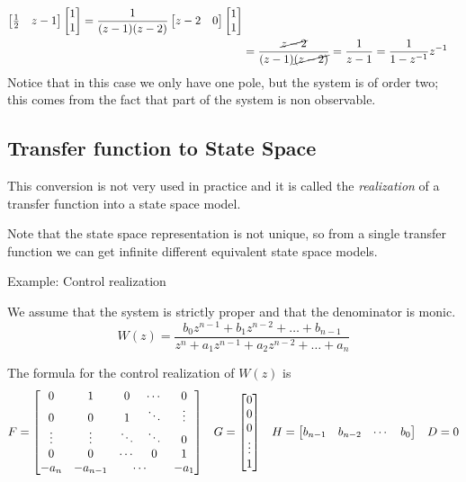 \begin{align*}
\begin{bmatrix}
    \frac{1}{2} & z-1\\
\end{bmatrix}
\begin{bmatrix}
    1\\
    1\\
\end{bmatrix}
=
\frac{1}{(z-1)(z-2)}
\begin{bmatrix}
    z-2 & 0\\
\end{bmatrix}
\begin{bmatrix}
    1\\
    1\\
\end{bmatrix}\\
&=
\frac{\cancel{z-2}}{(z-1)\cancel{(z-2)}} = \frac{1}{z-1} = \frac{1}{1-z^{-1}} z^{-1}
\end{align*}
Notice that in this case we only have one pole, but the system is of order two; this comes from the fact that part of the system is non observable.

\subsection{Transfer function to State Space}
This conversion is not very used in practice and it is called the \emph{realization} of a transfer function into a state space model.

Note that the state space representation is not unique, so from a single transfer function we can get infinite different equivalent state space models.

Example: Control realization

We assume that the system is strictly proper and that the denominator is monic.
\[ W(z) = \frac{b_0 z^{n-1} + b_1 z^{n-2} + \dots + b_{n-1}}{z^n + a_1 z^{n-1} + a_2 z^{n-2} + \dots + a_n} \]

The formula for the control realization of $W(z)$ is
\begin{align*}
    F = \begin{bmatrix}
        0 & 1 & 0 & \cdots & 0\\
        0& 0 & 1 & \ddots & \vdots \\
        \vdots & \vdots & \ddots & \ddots & 0\\
        0 & 0 & \cdots & 0 & 1\\
        -a_n & -a_{n-1} & \multicolumn{2}{c}{\cdots} & -a_1\\
    \end{bmatrix}
    &&
    G = \begin{bmatrix}
        0\\
        0\\
        0\\
        \vdots\\
        1\\
    \end{bmatrix}
    &&
    H = \begin{bmatrix}
        b_{n-1} & b_{n-2} & \cdots & b_0\\
    \end{bmatrix}
    &&
    D = 0
\end{align*}